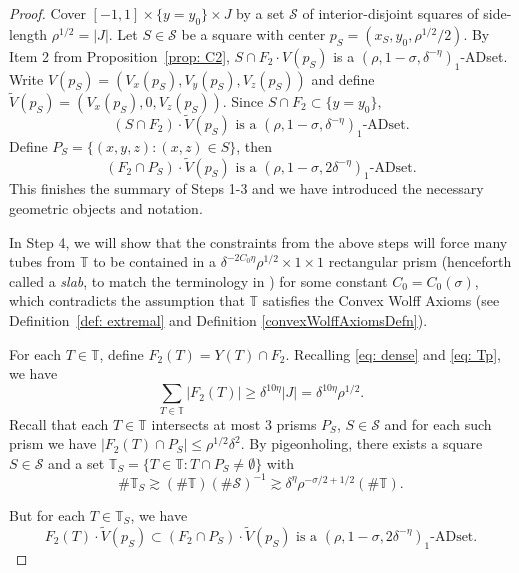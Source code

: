 \documentclass[letterpaper, reqno,11pt]{article}
\numberwithin{equation}{section}
\newcommand{\cS}{\mathcal{S}}
\newcommand{\TT}{\mathbb{T}}
\numberwithin{thm}{section}
\theoremstyle{remark}
\begin{document}
\begin{proof}
Cover $[-1,1]\times \{y=y_0\}\times J$ by a set $\mathcal{S}$ of interior-disjoint squares of side-length $\rho^{1/2}=|J|$. 
Let $S\in \cS$ be a square with center $p_S=(x_S, y_0, \rho^{1/2}/2)$. By Item 2 from Proposition~\ref{prop: C2}, 
$S\cap F_2 \cdot V(p_S)$ is a $(\rho, 1-\sigma, \delta^{-\eta})_1$-ADset. Write $V(p_S)=(V_x(p_S), V_y(p_S), V_z(p_S))$ and define  $\tilde{V}(p_S)=(V_x(p_S), 0, V_z(p_S))$.   Since $S\cap F_2\subset \{ y= y_0\}, $ 
\begin{equation}
    (S\cap F_2) \cdot \tilde{V}(p_S) \text{ is a } (\rho, 1-\sigma, \delta^{-\eta})_1\text{-ADset}.
\end{equation}
Define $P_S =\{(x,y,z): (x,z)\in S\}$, then 
\[
(F_2\cap P_S)\cdot \tilde{V}(p_S) \text{ is a } (\rho, 1-\sigma, 2\delta^{-\eta})_1\text{-ADset}. 
\]
This finishes the summary of Steps 1-3 and we have introduced the necessary geometric objects and notation. 

In Step 4, we will show that the constraints from the above steps will force many tubes from $\TT$ to be contained in a $\delta^{-2C_0\eta} \rho^{1/2}\times 1\times 1 $ rectangular prism (henceforth called a \emph{slab}, to match the terminology in \cite{WZ}) for some constant $C_0 = C_0(\sigma)$, which contradicts the assumption that $\TT$ satisfies the Convex Wolff Axioms (see Definition~\ref{def: extremal} and Definition \ref{convexWolffAxiomsDefn}). 

For each $T\in \TT$, define $F_2(T)=Y(T)\cap F_2$. Recalling \eqref{eq: dense} and \eqref{eq: Tp}, we have 
\begin{equation}
    \sum_{T\in \TT} |F_2(T)|\geq \delta^{10\eta} |J|=\delta^{10\eta} \rho^{1/2}. 
\end{equation}
Recall that each $T\in \TT$ intersects at most 3 prisms $P_S$, $S\in \cS$ and for each such prism we have $|F_2(T)\cap P_S|\leq \rho^{1/2}\delta^2$.  By pigeonholing, there exists a square $S\in \cS$ and a set $\TT_S =\{ T\in \TT: T\cap P_S\neq \emptyset\}$ with 
\begin{equation}\label{eq: TSlower}
\#\TT_S \gtrsim (\#\TT) (\#\cS)^{-1}\gtrsim \delta^{\eta}\rho^{-\sigma/2+1/2}(\#\TT).
\end{equation}

But for each $T\in \TT_S$, we have 
\begin{equation}\label{FTdotVADReg}
F_2(T)\cdot \tilde{V}(p_S) \subset (F_2\cap P_S)\cdot \tilde{V}(p_S) \text{ is a } (\rho, 1-\sigma, 2\delta^{-\eta})_1\text{-ADset}. 
\end{equation}


\end{proof}
\end{document}
